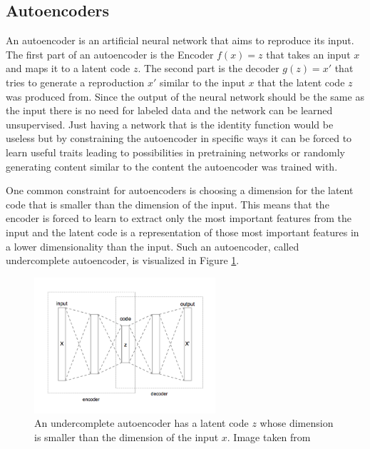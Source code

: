 \subsection{Autoencoders}

An autoencoder is an artificial neural network that aims to reproduce its input. The first part
of an autoencoder is the Encoder $f(x)=z$ that takes an input $x$ and maps it to a latent code $z$.
The second part is the decoder $g(z)=x'$ that tries to generate a reproduction $x'$ similar to the
input $x$ that the latent code $z$ was produced from. Since the output of the neural network should
be the same as the input there is no need for labeled data and the network can be learned unsupervised.
Just having a network that is the identity function would be useless but by constraining the autoencoder
in specific ways it can be forced to learn useful traits leading to possibilities in pretraining 
networks or randomly generating content similar to the content the autoencoder was trained with.

One common constraint for autoencoders is choosing a dimension for the latent code that is smaller
than the dimension of the input. This means that the encoder is forced to learn to extract only the
most important features from the input and the latent code is a representation of those most
important features in a lower dimensionality than the input. Such an autoencoder, called
undercomplete autoencoder, is visualized in Figure \ref{figure_undercomplete_ae}.

\begin{figure}[h]
    \centering
    \includegraphics[width=0.6\textwidth]{images/figures/Autoencoder_structure.png}
    \caption{An undercomplete autoencoder has a latent code $z$ whose dimension is smaller than the 
    dimension of the input $x$.
    Image taken from \parencite{2015-Chervinskii-autoencoder}} \label{figure_undercomplete_ae}
\end{figure}

